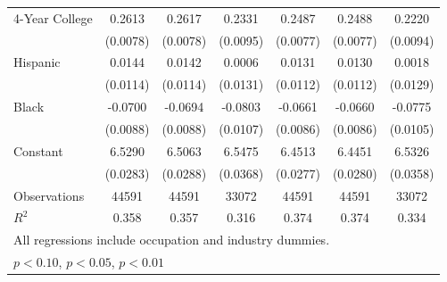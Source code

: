 {\begin{longtable}{l*{6}{c}}
4-Year College      &      0.2613\sym{***}&      0.2617\sym{***}&      0.2331\sym{***}&      0.2487\sym{***}&      0.2488\sym{***}&      0.2220\sym{***}\\
                    &    (0.0078)         &    (0.0078)         &    (0.0095)         &    (0.0077)         &    (0.0077)         &    (0.0094)         \\
Hispanic            &      0.0144         &      0.0142         &      0.0006         &      0.0131         &      0.0130         &      0.0018         \\
                    &    (0.0114)         &    (0.0114)         &    (0.0131)         &    (0.0112)         &    (0.0112)         &    (0.0129)         \\
Black               &     -0.0700\sym{***}&     -0.0694\sym{***}&     -0.0803\sym{***}&     -0.0661\sym{***}&     -0.0660\sym{***}&     -0.0775\sym{***}\\
                    &    (0.0088)         &    (0.0088)         &    (0.0107)         &    (0.0086)         &    (0.0086)         &    (0.0105)         \\
Constant            &      6.5290\sym{***}&      6.5063\sym{***}&      6.5475\sym{***}&      6.4513\sym{***}&      6.4451\sym{***}&      6.5326\sym{***}\\
                    &    (0.0283)         &    (0.0288)         &    (0.0368)         &    (0.0277)         &    (0.0280)         &    (0.0358)         \\
\hline  
Observations        &       44591         &       44591         &       33072         &       44591         &       44591         &       33072         \\
\(R^{2}\)           &       0.358         &       0.357         &       0.316         &       0.374         &       0.374         &       0.334         \\
\hline  
\multicolumn{7}{l}{\footnotesize All regressions include occupation and industry dummies.}\\
\multicolumn{7}{l}{\footnotesize \sym{*} \(p<0.10\), \sym{**} \(p<0.05\), \sym{***} \(p<0.01\)}\\
\end{longtable}
}

